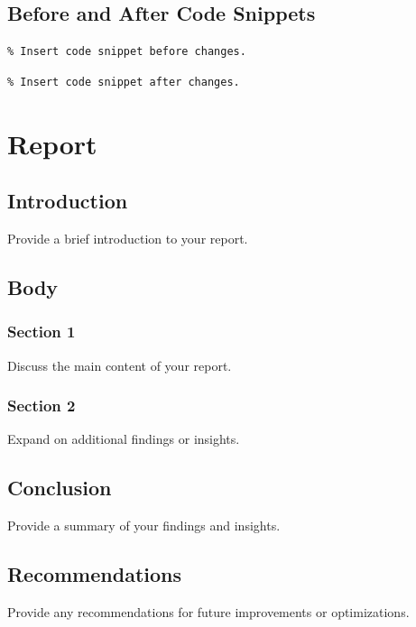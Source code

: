 \documentclass[12pt]{article}
\begin{document}
    \subsection{Before and After Code Snippets}
    \begin{lstlisting}
% Insert code snippet before changes.
    \end{lstlisting}

    \begin{lstlisting}
% Insert code snippet after changes.
    \end{lstlisting}


    \section{Report}

    \subsection{Introduction}
    Provide a brief introduction to your report.

    \subsection{Body}

    \subsubsection{Section 1}
    Discuss the main content of your report.

    \subsubsection{Section 2}
    Expand on additional findings or insights.

    \subsection{Conclusion}
    Provide a summary of your findings and insights.

    \subsection{Recommendations}
    Provide any recommendations for future improvements or optimizations.
\end{document}

